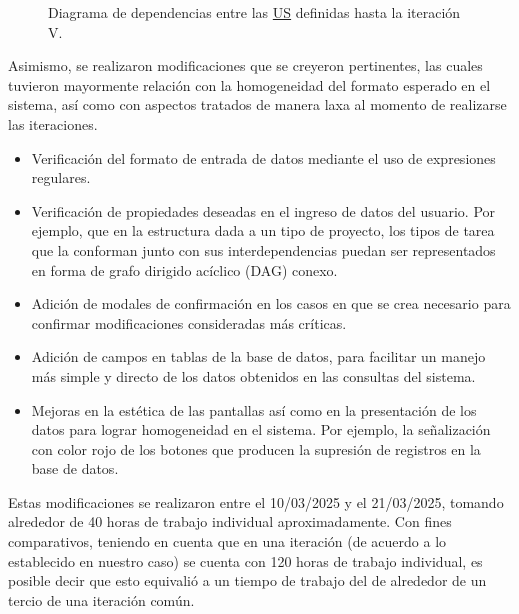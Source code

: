 \documentclass[a4paper, 12pt,twoside]{report}  %
\numberwithin{equation}{subsection} %
\begin{document}
\begin{figure}[h]
\begin{center}
{
		}
		\caption{Diagrama de dependencias entre las \protect\hyperlink{US}{US} definidas hasta la iteración V.}
		\label{diagrama_dependencias_US_final}
	\end{center}
\end{figure}

Asimismo, se realizaron modificaciones que se creyeron pertinentes, las cuales tuvieron mayormente relación con la homogeneidad del formato esperado en el sistema, así como con aspectos tratados de manera laxa al momento de realizarse las iteraciones.
\begin{itemize}
	\item Verificación del formato de entrada de datos mediante el uso de expresiones regulares.
	\item Verificación de propiedades deseadas en el ingreso de datos del usuario. Por ejemplo, que en la estructura dada a un tipo de proyecto, los tipos de tarea que la conforman junto con sus interdependencias puedan ser representados en forma de grafo dirigido acíclico (DAG) conexo.
	\item Adición de modales de confirmación en los casos en que se crea necesario para confirmar modificaciones consideradas más críticas.
	\item Adición de campos en tablas de la base de datos, para facilitar un manejo más simple y directo de los datos obtenidos en las consultas del sistema.
	\item Mejoras en la estética de las pantallas así como en la presentación de los datos para lograr homogeneidad en el sistema. Por ejemplo, la señalización con color rojo de los botones que producen la supresión de registros en la base de datos.
\end{itemize}
\indent Estas modificaciones se realizaron entre el 10/03/2025 y el 21/03/2025, tomando alrededor de 40 horas de trabajo individual aproximadamente. Con fines comparativos, teniendo en cuenta que en una iteración (de acuerdo a lo establecido en nuestro caso) se cuenta con 120 horas de trabajo individual, es posible decir que esto equivalió a un tiempo de trabajo del de alrededor de un tercio de una iteración común.
\end{document}
